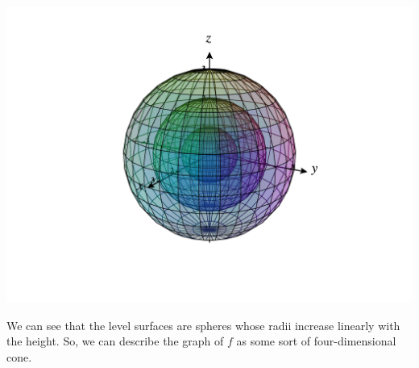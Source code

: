 \documentclass{ximera}
\begin{document}
\begin{example}
\begin{image}
\includegraphics[width = \textwidth]{CalcPlot3D-nested_level_surfaces}
\end{image}

We can see that the level surfaces are spheres whose radii increase linearly with the height. So, we can describe the graph of $f$ as some sort of four-dimensional cone.

\end{example}
\end{document}
